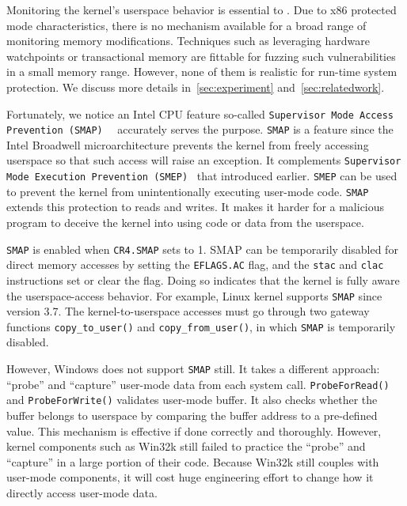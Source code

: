 Monitoring the kernel's userspace behavior is essential to \name. Due to x86 protected mode characteristics, there is no mechanism available for a broad range of monitoring memory modifications. Techniques such as leveraging hardware watchpoints or transactional memory are fittable for fuzzing such vulnerabilities in a small memory range. However, none of them is realistic for run-time system protection. We discuss more details in~\autoref{sec:experiment} and~\autoref{sec:relatedwork}.

Fortunately, we notice an Intel CPU feature so-called \texttt{Supervisor Mode Access Prevention (SMAP)}~\cite{corbet2012supervisorsmap}~\cite{mulnix2016intel} accurately serves the purpose.
\texttt{SMAP} is a feature since the Intel Broadwell microarchitecture prevents the kernel from freely accessing userspace so that such access will raise an exception. It complements \texttt{Supervisor Mode Execution Prevention (SMEP)}~\cite{fischer2011supervisor} that introduced earlier. \texttt{SMEP} can be used to prevent the kernel from unintentionally executing user-mode code. \texttt{SMAP} extends this protection to reads and writes. It makes it harder for a malicious program to deceive the kernel into using code or data from the userspace.

\texttt{SMAP} is enabled when \texttt{CR4.SMAP} sets to 1. SMAP can be temporarily disabled for direct memory accesses by setting the \texttt{EFLAGS.AC} flag, and the \texttt{stac} and \texttt{clac} instructions set or clear the flag. Doing so indicates that the kernel is fully aware the userspace-access behavior. For example, Linux kernel supports \texttt{SMAP} since version 3.7. The kernel-to-userspace accesses must go through two gateway functions \texttt{copy\_to\_user()} and \texttt{copy\_from\_user()}, in which \texttt{SMAP} is temporarily disabled.

However, Windows does not support \texttt{SMAP} still. It takes a different approach: ``probe'' and ``capture'' user-mode data from each system call. \texttt{ProbeForRead()}~\cite{probeforread} and \texttt{ProbeForWrite()} validates user-mode buffer. It also checks whether the buffer belongs to userspace by comparing the buffer address to a pre-defined value. This mechanism is effective if done correctly and thoroughly. However, kernel components such as Win32k still failed to practice the ``probe'' and ``capture'' in a large portion of their code. Because Win32k still couples with user-mode components, it will cost huge engineering effort to change how it directly access user-mode data.

